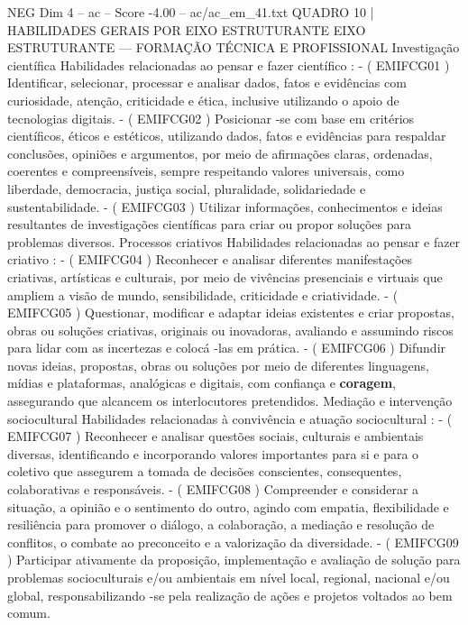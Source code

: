 \begin{textsample}{NEG Dim 4 – ac – Score -4.00 – ac/ac\_em\_41.txt}
QUADRO 10 | HABILIDADES GERAIS POR EIXO ESTRUTURANTE EIXO ESTRUTURANTE — FORMAÇÃO TÉCNICA E PROFISSIONAL Investigação científica Habilidades relacionadas ao pensar e fazer científico : - ( EMIFCG01 ) Identificar, selecionar, processar e analisar dados, fatos e evidências com curiosidade, atenção, criticidade e ética, inclusive utilizando o apoio de tecnologias digitais. - ( EMIFCG02 ) Posicionar -se com base em critérios científicos, éticos e estéticos, utilizando dados, fatos e evidências para respaldar conclusões, opiniões e argumentos, por meio de afirmações claras, ordenadas, coerentes e compreensíveis, sempre respeitando valores universais, como liberdade, democracia, justiça social, pluralidade, solidariedade e sustentabilidade. - ( EMIFCG03 ) Utilizar informações, conhecimentos e ideias resultantes de investigações científicas para criar ou propor soluções para problemas diversos.
Processos criativos Habilidades relacionadas ao pensar e fazer criativo : - ( EMIFCG04 ) Reconhecer e analisar diferentes manifestações criativas, artísticas e culturais, por meio de vivências presenciais e virtuais que ampliem a visão de mundo, sensibilidade, criticidade e criatividade. - ( EMIFCG05 ) Questionar, modificar e adaptar ideias existentes e criar propostas, obras ou soluções criativas, originais ou inovadoras, avaliando e assumindo riscos para lidar com as incertezas e colocá -las em prática. - ( EMIFCG06 ) Difundir novas ideias, propostas, obras ou soluções por meio de diferentes linguagens, mídias e plataformas, analógicas e digitais, com confiança e \textbf{coragem}, assegurando que alcancem os interlocutores pretendidos.
Mediação e intervenção sociocultural Habilidades relacionadas à convivência e atuação sociocultural : - ( EMIFCG07 ) Reconhecer e analisar questões sociais, culturais e ambientais diversas, identificando e incorporando valores importantes para si e para o coletivo que assegurem a tomada de decisões conscientes, consequentes, colaborativas e responsáveis. - ( EMIFCG08 ) Compreender e considerar a situação, a opinião e o sentimento do outro, agindo com empatia, flexibilidade e resiliência para promover o diálogo, a colaboração, a mediação e resolução de conflitos, o combate ao preconceito e a valorização da diversidade. - ( EMIFCG09 ) Participar ativamente da proposição, implementação e avaliação de solução para problemas socioculturais e/ou ambientais em nível local, regional, nacional e/ou global, responsabilizando -se pela realização de ações e projetos voltados ao bem comum.

\end{textsample}
